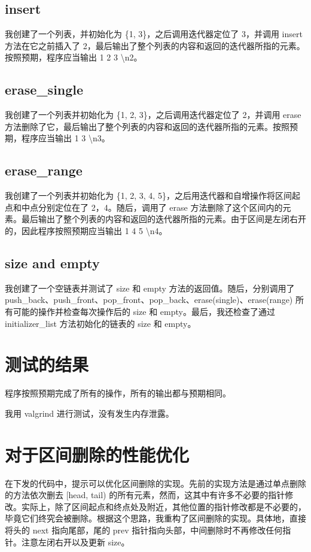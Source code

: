 \documentclass[UTF8]{ctexart}
\begin{document}
\subsection{insert}
我创建了一个列表，并初始化为 \{1, 3\}，之后调用迭代器定位了 3，并调用 insert 方法在它之前插入了 2，最后输出了整个列表的内容和返回的迭代器所指的元素。按照预期，程序应当输出 1 2 3 \textbackslash n2。
\subsection{erase\_single}
我创建了一个列表并初始化为 \{1, 2, 3\}，之后调用迭代器定位了 2，并调用 erase 方法删除了它，最后输出了整个列表的内容和返回的迭代器所指的元素。按照预期，程序应当输出 1 3 \textbackslash n3。
\subsection{erase\_range}
我创建了一个列表并初始化为 \{1, 2, 3, 4, 5\}，之后用迭代器和自增操作将区间起点和中点分别定位在了 2，4。随后，调用了 erase 方法删除了这个区间内的元素。最后输出了整个列表的内容和返回的迭代器所指的元素。由于区间是左闭右开的，因此程序按照预期应当输出 1 4 5 \textbackslash n4。
\subsection{size and empty}
我创建了一个空链表并测试了 size 和 empty 方法的返回值。随后，分别调用了 push\_back、push\_front、pop\_front、pop\_back、erase(single)、erase(range) 所有可能的操作并检查每次操作后的 size 和 empty。最后，我还检查了通过 initializer\_list 方法初始化的链表的 size 和 empty。


\section{测试的结果}

程序按照预期完成了所有的操作，所有的输出都与预期相同。

我用 valgrind 进行测试，没有发生内存泄露。

\section{对于区间删除的性能优化}

在下发的代码中，提示可以优化区间删除的实现。先前的实现方法是通过单点删除的方法依次删去 [head, tail) 的所有元素，然而，这其中有许多不必要的指针修改。实际上，除了区间起点和终点处及附近，其他位置的指针修改都是不必要的，毕竟它们终究会被删除。根据这个思路，我重构了区间删除的实现。具体地，直接将头的 next 指向尾部，尾的 prev 指针指向头部，中间删除时不再修改任何指针。注意左闭右开以及更新 size。
\end{document}
